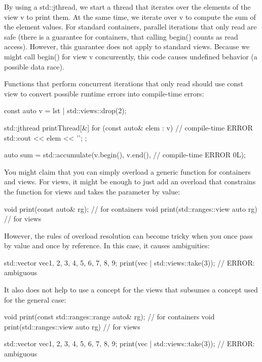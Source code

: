 By using a std::jthread, we start a thread that iterates over the elements of the view v to print them. At the same time, we iterate over v to compute the sum of the element values. For standard containers, parallel iterations that only read are safe (there is a guarantee for containers, that calling begin() counts as read access). However, this guarantee does not apply to standard views. Because we might call begin() for view v concurrently, this code causes undefined behavior (a possible data race).

Functions that perform concurrent iterations that only read should use const view to convert possible runtime errors into compile-time errors:

\begin{cpp}
const auto v = lst | std::views::drop(2);

std::jthread printThread{[&] {
		for (const auto& elem : v) { // compile-time ERROR
			std::cout << elem << '\n';
		}
}};

auto sum = std::accumulate(v.begin(), v.end(), // compile-time ERROR
0L);
\end{cpp}


You might claim that you can simply overload a generic function for containers and views. For views, it might be enough to just add an overload that constrains the function for views and takes the parameter by value:

\begin{cpp}
void print(const auto& rg); // for containers
void print(std::ranges::view auto rg) // for views
\end{cpp}

However, the rules of overload resolution can become tricky when you once pass by value and once by reference. In this case, it causes ambiguities:

\begin{cpp}
std::vector vec{1, 2, 3, 4, 5, 6, 7, 8, 9};
print(vec | std::views::take(3)); // ERROR: ambiguous
\end{cpp}

It also does not help to use a concept for the views that subsumes a concept used for the general case:

\begin{cpp}
void print(const std::ranges::range auto& rg); // for containers
void print(std::ranges::view auto rg) // for views

std::vector vec{1, 2, 3, 4, 5, 6, 7, 8, 9};
print(vec | std::views::take(3)); // ERROR: ambiguous
\end{cpp}

